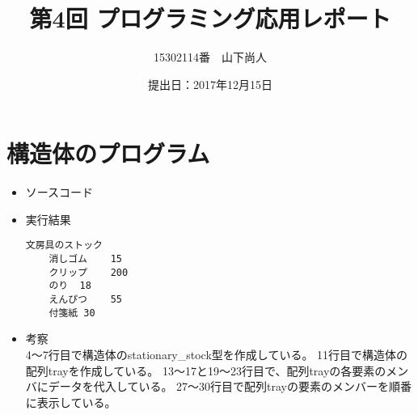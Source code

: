 \documentclass[a4paper]{jsarticle}
\title{第4回 プログラミング応用レポート}
\author{15302114番　山下尚人}
\date{提出日：2017年12月15日}
\begin{document}
\maketitle%

\section{構造体のプログラム}
	\begin{itemize}
	\item ソースコード
		 
		\mbox{}\newline
	\item 実行結果
		\begin{lstlisting}
文房具のストック
	消しゴム	15
	クリップ	200
	のり	18
	えんぴつ	55
	付箋紙	30
		\end{lstlisting}
		\mbox{}\newline
	\item 考察\mbox{}\\
		4〜7行目で構造体のstationary\_stock型を作成している。
		11行目で構造体の配列trayを作成している。
		13〜17と19〜23行目で、配列trayの各要素のメンバにデータを代入している。
		27〜30行目で配列trayの要素のメンバーを順番に表示している。
	\end{itemize}
\end{document}
